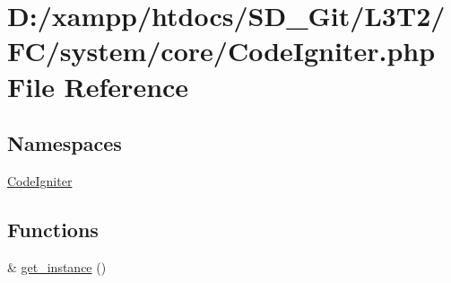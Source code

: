 \hypertarget{system_2core_2_code_igniter_8php}{}\section{D\+:/xampp/htdocs/\+S\+D\+\_\+\+Git/\+L3\+T2/\+F\+C/system/core/\+Code\+Igniter.php File Reference}
\label{system_2core_2_code_igniter_8php}
\subsection*{Namespaces}
\begin{DoxyCompactItemize}
\item 
 \hyperlink{namespace_code_igniter}{Code\+Igniter}
\end{DoxyCompactItemize}
\subsection*{Functions}
\begin{DoxyCompactItemize}
\item 
\& \hyperlink{system_2core_2_code_igniter_8php_a185483844bd20a0e80955460d66d2199}{get\+\_\+instance} ()
\end{DoxyCompactItemize}
